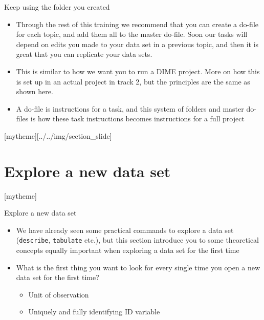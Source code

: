 \documentclass[aspectratio=169]{beamer}
\newcommand{\sectionpic}[2]{
	\setbeamertemplate{section page}[mytheme][#2]
	\section{#1}
	\setbeamertemplate{section page}[mytheme]
}
\begin{document}
\begin{frame}{Keep using the folder you created}
	\begin{itemize}
		\item Through the rest of this training we recommend that you can create a do-file for each topic, and add them all to the master do-file. Soon our tasks will depend on edits you made to your data set in a previous topic, and then it is great that you can replicate your data sets.
		\item This is similar to how we want you to run a DIME project. More on how this is set up in an actual project in track 2, but the principles are the same as shown here.
		\item A do-file is instructions for a task, and this system of folders and master do-files is how these task instructions becomes instructions for a full project
	\end{itemize}
\end{frame}

\sectionpic{Explore a new data set}{../../img/section_slide}

\begin{frame}{Explore a new data set}
	\begin{itemize}
		\item We have already seen some practical commands to explore a data set (\texttt{describe}, \texttt{tabulate} etc.), but this section introduce you to some theoretical concepts equally important when exploring a data set for the first time
		\item What is the first thing you want to look for every single time you open a new data set for the first time?
		\begin{itemize}
			\item Unit of observation
			\item Uniquely and fully identifying ID variable
		\end{itemize}
	\end{itemize}
\end{frame}
\end{document}
